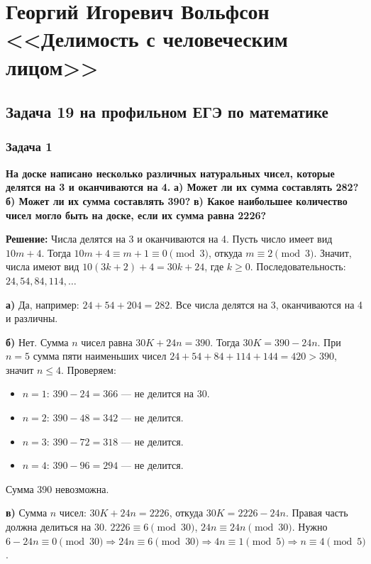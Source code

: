 \documentclass[12pt, a4paper]{article}
\begin{document}
\section*{Георгий Игоревич Вольфсон <<Делимость с человеческим лицом>>}

\subsection*{Задача 19 на профильном ЕГЭ по математике}

\subsubsection*{Задача 1}
\textbf{На доске написано несколько различных натуральных чисел, которые делятся на 3 и оканчиваются на 4.}
\textbf{а) Может ли их сумма составлять 282?}
\textbf{б) Может ли их сумма составлять 390?}
\textbf{в) Какое наибольшее количество чисел могло быть на доске, если их сумма равна 2226?}

\textbf{Решение:}
Числа делятся на 3 и оканчиваются на 4. Пусть число имеет вид \(10m + 4\). Тогда \(10m + 4 \equiv m + 1 \equiv 0 \pmod{3}\), откуда \(m \equiv 2 \pmod{3}\). Значит, числа имеют вид \(10(3k+2) + 4 = 30k + 24\), где \(k \ge 0\). Последовательность: \(24, 54, 84, 114, \ldots\)

\textbf{а)} Да, например: \(24 + 54 + 204 = 282\). Все числа делятся на 3, оканчиваются на 4 и различны.

\textbf{б)} Нет. Сумма \(n\) чисел равна \(30K + 24n = 390\). Тогда \(30K = 390 - 24n\). При \(n=5\) сумма пяти наименьших чисел \(24+54+84+114+144 = 420 > 390\), значит \(n \le 4\). Проверяем:
\begin{itemize}
    \item \(n=1\): \(390 - 24 = 366\) — не делится на 30.
    \item \(n=2\): \(390 - 48 = 342\) — не делится.
    \item \(n=3\): \(390 - 72 = 318\) — не делится.
    \item \(n=4\): \(390 - 96 = 294\) — не делится.
\end{itemize}
Сумма 390 невозможна.

\textbf{в)} Сумма \(n\) чисел: \(30K + 24n = 2226\), откуда \(30K = 2226 - 24n\). Правая часть должна делиться на 30. \(2226 \equiv 6 \pmod{30}\), \(24n \equiv 24n \pmod{30}\). Нужно \(6 - 24n \equiv 0 \pmod{30} \Rightarrow 24n \equiv 6 \pmod{30} \Rightarrow 4n \equiv 1 \pmod{5} \Rightarrow n \equiv 4 \pmod{5}\).
\end{document}
